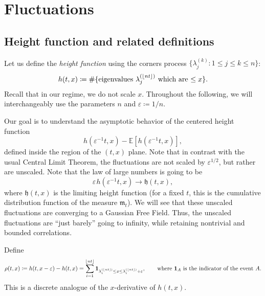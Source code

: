 \documentclass[letterpaper,11pt,oneside,reqno]{article}
\numberwithin{equation}{section}
\newcommand{\ssp}{\hspace{1pt}}
\theoremstyle{definition}
\begin{document}
\section{Fluctuations}

\subsection{Height function and related definitions}

Let us define the \emph{height function} using the corners process
$\{ \lambda^{(k)}_j\colon 1\le j\le k\le n \}$:
\begin{equation*}
	h(t,x)\coloneqq \#
	\{ \textnormal{eigenvalues $\lambda^{(\lfloor nt \rfloor )}_j$ which
	are $\leq x$} \}.
\end{equation*}
Recall that in our regime, we do not scale $x$.
Throughout the following, we will interchangeably use
the parameters $n$ and
$\varepsilon\coloneqq 1/n$.

Our goal is to understand the asymptotic behavior of the centered height function
$$
h(\varepsilon^{-1}t, x) - \mathbb{E}[h(\varepsilon^{-1}t, x)]
,
$$
defined inside the region of the $(t,x)$ plane.
Note that in contrast with the usual Central Limit Theorem,
the fluctuations are not scaled by $\varepsilon^{1/2}$,
but rather are unscaled.
Note that the law of large numbers is going to be
\begin{equation*}
	\varepsilon
	\ssp h(\varepsilon^{-1}t, x) \to
	\mathfrak{h}(t,x),
\end{equation*}
where $\mathfrak{h}(t,x)$ is the limiting height function
(for a fixed $t$, this is the cumulative distribution function
of the measure $\mathfrak{m}_t$).
We will see that these unscaled fluctuations are
converging to a Gaussian Free Field. Thus,
the unscaled fluctuations
are ``just barely'' going to infinity,
while retaining nontrivial and bounded correlations.

Define
\begin{equation}
	\label{eq:rho_definition}
	\rho(t,x) \coloneqq h(t,x-\varepsilon)-h(t,x)= \sum_{i=1}^{\lfloor nt \rfloor }
	\mathbf{1}_{\lambda_i^{(\lfloor nt \rfloor )}\le x\le \lambda_{i}^{(\lfloor nt \rfloor )}+\varepsilon},\qquad \textnormal{where $\mathbf{1}_A$ is the indicator of the event $A$.}
\end{equation}
This is a discrete analogue of the $x$-derivative of $h(t,x)$.

\end{document}
